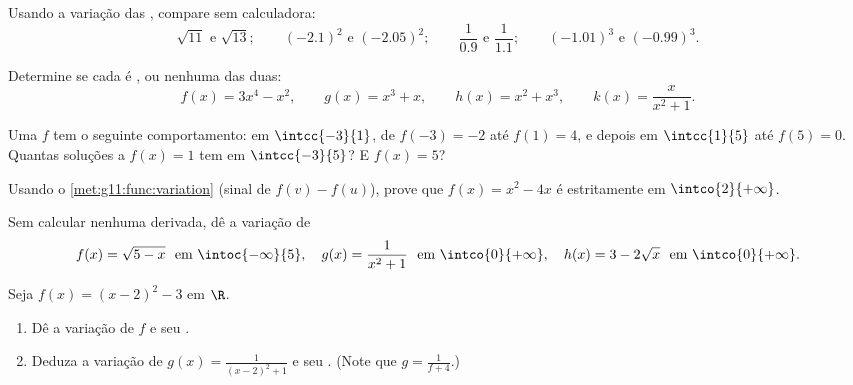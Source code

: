 \begin{exercise}[$\star$]\label{exo:g11:func:2}
Usando a variação das , compare sem calculadora:
\[
\sqrt{11} \text{ e } \sqrt{13}; \qquad
(-2.1)^2 \text{ e } (-2.05)^2; \qquad
\frac{1}{0.9} \text{ e } \frac{1}{1.1}; \qquad
(-1.01)^3 \text{ e } (-0.99)^3 .
\]
\end{exercise}

\begin{exercise}[$\star$]\label{exo:g11:func:3}
Determine se cada  é ,  ou nenhuma das duas:
\[
f(x) = 3x^4 - x^2, \qquad
g(x) = x^3 + x, \qquad
h(x) = x^2 + x^3, \qquad
k(x) = \frac{x}{x^2+1} .
\]
\end{exercise}

\begin{exercise}[$\star$]\label{exo:g11:func:4}
Uma  $f$ tem o seguinte comportamento:  em
$\intcc{-3}{1}$, de $f(-3) = -2$ até $f(1) = 4$, e depois  em
$\intcc{1}{5}$ até $f(5) = 0$. Quantas soluções a  $f(x) = 1$ tem
em $\intcc{-3}{5}$? E $f(x) = 5$?
\end{exercise}

\begin{exercise}[$\star\star$]\label{exo:g11:func:5}
Usando o \cref{met:g11:func:variation} (sinal de $f(v) - f(u)$), prove
que $f(x) = x^2 - 4x$ é estritamente  em $\intco{2}{+\infty}$.
\end{exercise}

\begin{exercise}[$\star\star$]\label{exo:g11:func:6}
Sem calcular nenhuma derivada, dê a variação de
\[
f(x) = \sqrt{5 - x} \ \text{ em } \intoc{-\infty}{5},
\quad
g(x) = \frac{1}{x^2 + 1} \ \text{ em } \intco{0}{+\infty},
\quad
h(x) = 3 - 2\sqrt{x} \ \text{ em } \intco{0}{+\infty}.
\]
\end{exercise}

\begin{exercise}[$\star\star$]\label{exo:g11:func:7}
Seja $f(x) = (x-2)^2 - 3$ em $\R$.
\begin{enumerate}
  \item Dê a variação de $f$ e seu .
  \item Deduza a variação de $g(x) = \frac{1}{(x-2)^2+1}$ e seu .
        (Note que $g = \frac{1}{f + 4}$.)
\end{enumerate}
\end{exercise}

